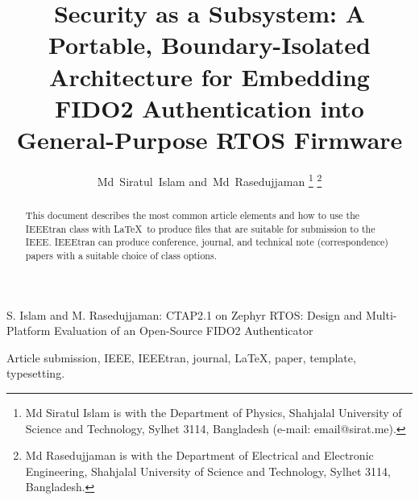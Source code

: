 \documentclass[lettersize,journal]{IEEEtran}
\begin{document}
\title{Security as a Subsystem: A Portable, Boundary-Isolated Architecture for Embedding FIDO2 Authentication into General-Purpose RTOS Firmware}

\author{
    Md~Siratul~Islam
    and~Md~Rasedujjaman
    \thanks{Md Siratul Islam is with the Department of Physics, Shahjalal University of Science and Technology, Sylhet 3114, Bangladesh (e-mail: email@sirat.me).}
    \thanks{Md Rasedujjaman is with the Department of Electrical and Electronic Engineering, Shahjalal University of Science and Technology, Sylhet 3114, Bangladesh.}
}

%
{S. Islam and M. Rasedujjaman: CTAP2.1 on Zephyr RTOS: Design and Multi-Platform Evaluation of an Open-Source FIDO2 Authenticator}


\maketitle

\begin{abstract}
This document describes the most common article elements and how to use the IEEEtran class with \LaTeX \ to produce files that are suitable for submission to the IEEE.  IEEEtran can produce conference, journal, and technical note (correspondence) papers with a suitable choice of class options.
\end{abstract}

\begin{IEEEkeywords}
Article submission, IEEE, IEEEtran, journal, \LaTeX, paper, template, typesetting.
\end{IEEEkeywords}









\newpage


\vfill
\end{document}
